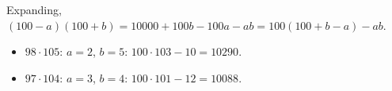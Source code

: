 Expanding, $(100-a)(100+b)=10000+100b-100a-ab=100(100+b-a)-ab$.
\begin{itemize}
\item $98\cdot105$: $a=2$, $b=5$: $100\cdot103-10=\boxed{10290}$.
\item $97\cdot104$: $a=3$, $b=4$: $100\cdot101-12=\boxed{10088}$.
\end{itemize}
